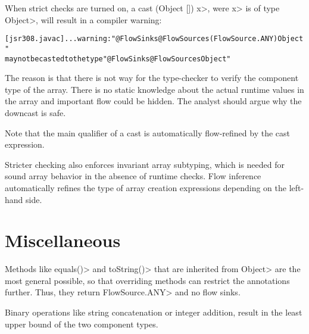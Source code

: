 When strict checks are turned on,
a cast \<(Object []) x>, were \<x> is of type \<Object>, will result
in a compiler warning:

\begin{alltt}
[jsr308.javac] ... warning: "@FlowSinks @FlowSources({FlowSource.ANY}) Object"
       may not be casted to the type "@FlowSinks @FlowSources Object"
\end{alltt}

The reason is that there is not way for the type-checker to verify
 the component type of the array. There is no static knowledge about the actual
runtime values in the array and important flow could be hidden.
The analyst should argue why the downcast is safe.

Note that the main qualifier of a cast is automatically flow-refined
by the cast expression.


\medskip

Stricter checking also enforces invariant array subtyping, which is
needed for sound array behavior in the absence of runtime checks.
Flow inference automatically refines the type of array creation
expressions depending on the left-hand side.

\section{Miscellaneous}

Methods like \<equals()> and \<toString()> that are inherited from
\<Object> are the most general possible, so that overriding methods
can restrict the annotations further. Thus, they
return \<FlowSource.ANY> and no flow sinks.

Binary operations like string concatenation or integer addition,
result in the least upper bound of the two component types.





